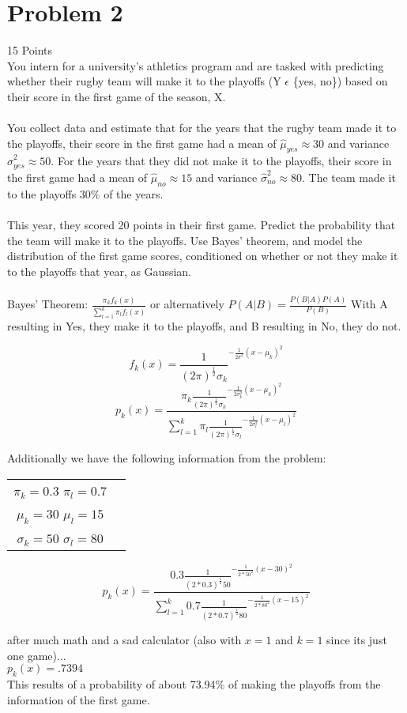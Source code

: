 \documentclass[12pt]{article}
\newcommand\tab[1][1cm]{\hspace*{#1}}
\begin{document}
\section{Problem 2}
15 Points\\
You intern for a university's athletics program and are tasked with predicting whether their rugby team will make it to the playoffs (Y $\epsilon$ \{yes, no\}) based on their  score in the first game of the season, X.\\\\
You collect data and estimate that for the years that the rugby team made it to the playoffs, their score in the first game had a mean of $\hat{\mu}_{yes} \approx 30$ and variance $\hat{\sigma}^2_{yes} \approx 50$. For the years that they did not make it to the playoffs, their score in the first game had a mean of $\hat{\mu}_{no} \approx 15$ and variance $\hat{\sigma}^2_{no} \approx 80$. The team made it to the playoffs $30\%$ of the years.\\\\
This year, they scored 20 points in their first game. Predict the probability that the team will make it to the playoffs. Use Bayes' theorem, and model the distribution of the first game scores, conditioned on whether or not they make it to the playoffs that year, as Gaussian.
\\\\
Bayes' Theorem: $\frac{\pi_kf_k(x)}{\sum^k_{l=1}\pi_lf_l(x)}$ or alternatively $P(A|B) = \frac{P(B|A)P(A)}{P(B)}$ With A resulting in Yes, they make it to the playoffs, and B resulting in No, they do not.

\[
    f_k(x) = \frac{1}{(2\pi)^{\frac{1}{2}}\sigma_k}^{-\frac{1}{2\sigma^2}(x-\mu_k)^2}
\]
\[
    p_k(x)=\frac{\pi_k\frac{1}{(2\pi)^{\frac{1}{2}}\sigma_k}^{-\frac{1}{2\sigma_k^2}(x-\mu_k)^2}}{\sum^k_{l=1}\pi_l\frac{1}{(2\pi)^{\frac{1}{2}}\sigma_l}^{-\frac{1}{2\sigma_l^2}(x-\mu_l)^2}}
\]

Additionally we have the following information from the problem:\\
\begin{center}
    \begin{tabular}{c c}
        $\pi_k = 0.3$       \tab$\pi_l = 0.7$   \\
        $\mu_k = 30$        \tab$\mu_l = 15$    \\
        $\sigma_k = 50$     \tab$\sigma_l = 80$ \\
    \end{tabular}
\end{center}

\[
    p_k(x)=\frac{0.3\frac{1}{(2*0.3)^{\frac{1}{2}}50}^{-\frac{1}{2*50^2}(x-30)^2}}{\sum^k_{l=1}0.7\frac{1}{(2*0.7)^{\frac{1}{2}}80}^{-\frac{1}{2*80^2}(x-15)^2}}
\]
\begin{center}
    after much math and a sad calculator (also with $x = 1$ and $k = 1$ since its just one game)...\\
    $p_k(x) = .7394$\\
    This results of a probability of about 73.94\% of making the playoffs from the information of the first game.
\end{center}
\end{document}
